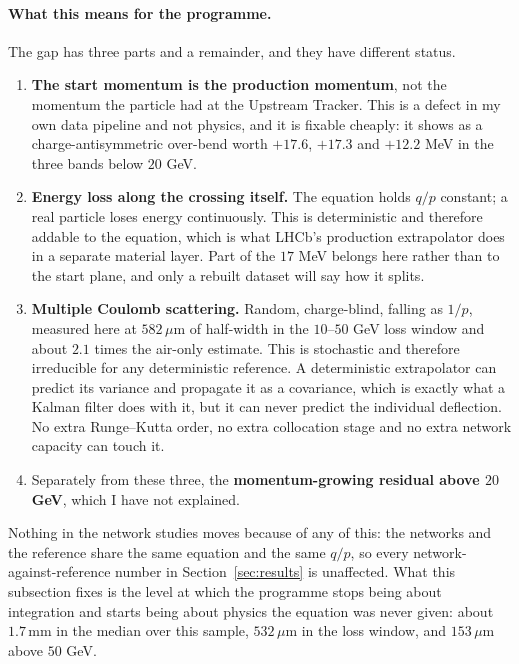 \documentclass[11pt,a4paper]{article}
\newcommand{\um}{\ensuremath{\,\mu\mathrm{m}}}
\newcommand{\mm}{\ensuremath{\,\mathrm{mm}}}
\begin{document}
\paragraph{What this means for the programme.} The gap has three parts and a
remainder, and they have different status.
\begin{enumerate}\setlength{\itemsep}{2pt}
  \item \textbf{The start momentum is the production momentum}, not the momentum
  the particle had at the Upstream Tracker. This is a defect in my own data
  pipeline and not physics, and it is fixable cheaply: it shows as a
  charge-antisymmetric over-bend worth $+17.6$, $+17.3$ and $+12.2$ MeV in the
  three bands below $20$ GeV.
  \item \textbf{Energy loss along the crossing itself.} The equation holds $q/p$
  constant; a real particle loses energy continuously. This is deterministic and
  therefore addable to the equation, which is what LHCb's production extrapolator
  does in a separate material layer. Part of the $17$ MeV belongs here rather
  than to the start plane, and only a rebuilt dataset will say how it splits.
  \item \textbf{Multiple Coulomb scattering.} Random, charge-blind, falling as
  $1/p$, measured here at $582\um$ of half-width in the $10$--$50$ GeV loss
  window and about $2.1$ times the air-only estimate. This is stochastic and
  therefore irreducible for any deterministic reference. A deterministic
  extrapolator can predict its variance and propagate it as a covariance, which
  is exactly what a Kalman filter does with it, but it can never predict the
  individual deflection. No extra Runge--Kutta order, no extra collocation stage
  and no extra network capacity can touch it.
  \item Separately from these three, the \textbf{momentum-growing residual above
  $20$ GeV}, which I have not explained.
\end{enumerate}

Nothing in the network studies moves because of any of this: the networks and the
reference share the same equation and the same $q/p$, so every
network-against-reference number in Section~\ref{sec:results} is unaffected.
What this subsection fixes is the level at which the programme stops being about
integration and starts being about physics the equation was never given: about
$1.7\mm$ in the median over this sample, $532\um$ in the loss window, and
$153\um$ above $50$ GeV.

\end{document}
